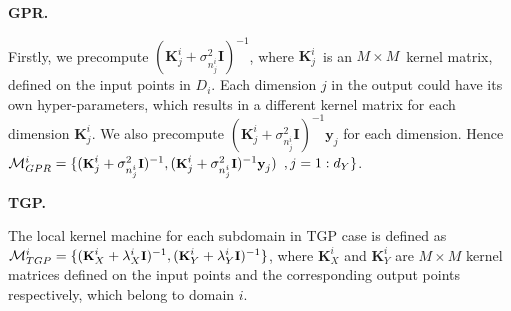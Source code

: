 \textbf{ {GPR}.} Firstly, we  precompute $(\textbf{K}^i_j + \sigma^2_{n^i_j} \textbf{I})^{-1} $, where  $\textbf{K}^i_j\,$ is an $M \times M\,$  kernel matrix, defined on the input points in  $D_i$. Each dimension $j$ in the output could have its own hyper-parameters, which results in a different kernel matrix for each dimension $\textbf{K}^i_j$. We also precompute $(\textbf{K}^i_j + \sigma^2_{n^i_j} \textbf{I})^{-1} \textbf{y}_j$ for each dimension. Hence  $\mathcal{M}^i_{GPR} = \small\{ ( \textbf{K}^i_j + \sigma^2_{n^i_j} \textbf{I})^{-1},  (\textbf{K}^i_j + \sigma^2_{n^i_j} \textbf{I})^{-1} \textbf{y}_j )$ $, j=1 : d_Y \}\normalsize$.

\textbf{{TGP.}}  The local kernel machine for each subdomain in TGP case is defined as $\mathcal{M}^i_{TGP} = \small\{(\textbf{K}_X^i + \lambda_{X}^i  \textbf{I})^{-1}, (\textbf{K}_Y^i + \lambda_{Y}^i  \textbf{I})^{-1}\}\normalsize$,  where $\textbf{K}_X^i$ and $\textbf{K}_Y^i$ are $M \times M$ kernel matrices defined on the input points and the corresponding output points respectively, which belong to domain $i$. 


